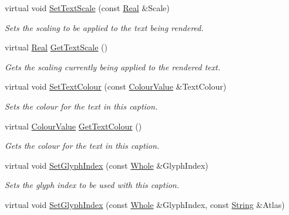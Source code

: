 \begin{DoxyCompactItemize}
virtual void \hyperlink{classphys_1_1UI_1_1Caption_a050347af6977e21804bac00fb208c18d}{SetTextScale} (const \hyperlink{namespacephys_af7eb897198d265b8e868f45240230d5f}{Real} \&Scale)
\begin{DoxyCompactList}\small\item\em Sets the scaling to be applied to the text being rendered. \item\end{DoxyCompactList}\item 
virtual \hyperlink{namespacephys_af7eb897198d265b8e868f45240230d5f}{Real} \hyperlink{classphys_1_1UI_1_1Caption_a6c916aef18864826feca84a6b8ddf619}{GetTextScale} ()
\begin{DoxyCompactList}\small\item\em Gets the scaling currently being applied to the rendered text. \item\end{DoxyCompactList}\item 
virtual void \hyperlink{classphys_1_1UI_1_1Caption_a48e02a811a03a7542ee9bdcc4303a264}{SetTextColour} (const \hyperlink{classphys_1_1ColourValue}{ColourValue} \&TextColour)
\begin{DoxyCompactList}\small\item\em Sets the colour for the text in this caption. \item\end{DoxyCompactList}\item 
virtual \hyperlink{classphys_1_1ColourValue}{ColourValue} \hyperlink{classphys_1_1UI_1_1Caption_a32bb578e6e92986839e1cd49edfe9422}{GetTextColour} ()
\begin{DoxyCompactList}\small\item\em Gets the colour for the text in this caption. \item\end{DoxyCompactList}\item 
virtual void \hyperlink{classphys_1_1UI_1_1Caption_aacf236680c364176d70ff2cc753afece}{SetGlyphIndex} (const \hyperlink{namespacephys_a460f6bc24c8dd347b05e0366ae34f34a}{Whole} \&GlyphIndex)
\begin{DoxyCompactList}\small\item\em Sets the glyph index to be used with this caption. \item\end{DoxyCompactList}\item 
virtual void \hyperlink{classphys_1_1UI_1_1Caption_a057f739be58fcc79c03d7089b71d3d9d}{SetGlyphIndex} (const \hyperlink{namespacephys_a460f6bc24c8dd347b05e0366ae34f34a}{Whole} \&GlyphIndex, const \hyperlink{namespacephys_aa03900411993de7fbfec4789bc1d392e}{String} \&Atlas)

\end{DoxyCompactItemize}
